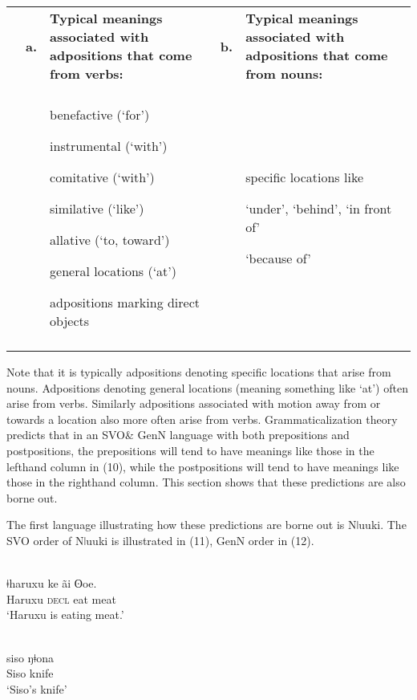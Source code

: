 \documentclass[output=paper]{langsci/langscibook}
\begin{document}
\begin{table}
\begin{tabularx}{\textwidth}{XXXXX}
\lsptoprule
& \bfseries a. & \bfseries Typical meanings associated with  adpositions that come from verbs: & \bfseries b. & \bfseries Typical meanings associated with adpositions that come from nouns:\\
&  &  &  & \\
&  & {benefactive (‘for’)}

{instrumental (‘with’)}

{comitative (‘with’)}

{similative (‘like’)}

{allative (‘to, toward’)}

{general locations (‘at’)}

adpositions marking direct objects &  & {specific locations like}

{‘under’, ‘behind’, ‘in front of’}

‘because of’\\
\lspbottomrule
\end{tabularx}
\end{table}

Note that it is typically adpositions denoting specific locations that arise from nouns. Adpositions denoting general locations (meaning something like ‘at’) often arise from verbs. Similarly adpositions associated with motion away from or towards a location also more often arise from verbs. Grammaticalization theory predicts that in an SVO\& GenN language with both prepositions and postpositions, the prepositions will tend to have meanings like those in the lefthand column in (10), while the postpositions will tend to have meanings like those in the righthand column. This section shows that these predictions are also borne out.

The first language illustrating how these predictions are borne out is Nǀuuki. The SVO order of Nǀuuki is illustrated in (11), GenN order in (12).

\ea\label{ex:dryer:}
\\
\gll ǂharuxu    ke  ãi  ʘoe.\\
       Haruxu  \textsc{decl}  eat  meat \\
\glt ‘Haruxu is eating meat.’  
\z

\ea\label{ex:dryer:}
\\
\gll siso  ŋǂona\\
       Siso  knife\\
\glt   ‘Siso’s knife’
\z
\end{document}
